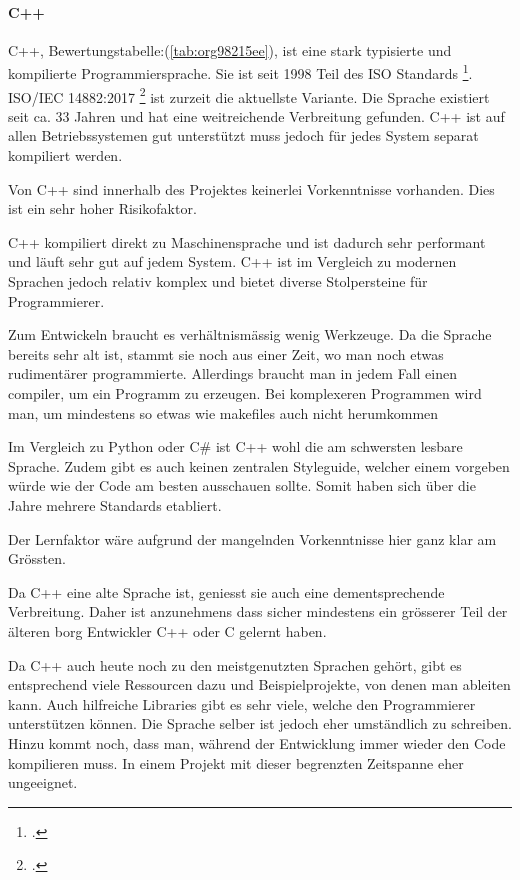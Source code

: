 \paragraph{C++}
\label{sec:orga42458f}

C++, Bewertungstabelle:(\ref{tab:org98215ee}), ist eine stark typisierte und kompilierte Programmiersprache. Sie ist seit
1998 Teil des ISO Standards \footcite{cpp98}. ISO/IEC 14882:2017 \footcite{cpp17}
ist zurzeit die aktuellste Variante. Die Sprache existiert seit ca. 33 Jahren
und hat eine weitreichende Verbreitung gefunden. C++ ist auf allen
Betriebssystemen gut unterstützt muss jedoch für jedes System separat
kompiliert werden.

Von C++ sind innerhalb des Projektes keinerlei Vorkenntnisse vorhanden. Dies
ist ein sehr hoher Risikofaktor.

C++ kompiliert direkt zu Maschinensprache und ist dadurch sehr performant und
läuft sehr gut auf jedem System. C++ ist im Vergleich zu modernen Sprachen
jedoch relativ komplex und bietet diverse Stolpersteine für Programmierer.

Zum Entwickeln braucht es verhältnismässig wenig Werkzeuge. Da die Sprache
bereits sehr alt ist, stammt sie noch aus einer Zeit, wo man noch etwas
rudimentärer programmierte. Allerdings braucht man in jedem Fall einen
\gls{compiler}, um ein Programm zu erzeugen. Bei komplexeren Programmen wird man,
um mindestens so etwas wie \glspl{makefile} auch nicht herumkommen

Im Vergleich zu Python oder C\# ist C++ wohl die am schwersten lesbare Sprache.
Zudem gibt es auch keinen zentralen Styleguide, welcher einem vorgeben würde wie
der Code am besten ausschauen sollte. Somit haben sich über die Jahre mehrere
Standards etabliert.

Der Lernfaktor wäre aufgrund der mangelnden Vorkenntnisse hier ganz klar am
Grössten.

Da C++ eine alte Sprache ist, geniesst sie auch eine dementsprechende
Verbreitung. Daher ist anzunehmens dass sicher mindestens ein grösserer Teil der
älteren \gls{borg} Entwickler C++ oder C gelernt haben.

Da C++ auch heute noch zu den meistgenutzten Sprachen gehört, gibt es
entsprechend viele Ressourcen dazu und Beispielprojekte, von denen man ableiten
kann. Auch hilfreiche Libraries gibt es sehr viele, welche den Programmierer
unterstützen können. Die Sprache selber ist jedoch eher umständlich zu
schreiben. Hinzu kommt noch, dass man, während der Entwicklung immer wieder den
Code kompilieren muss. In einem Projekt mit dieser begrenzten Zeitspanne eher
ungeeignet.

